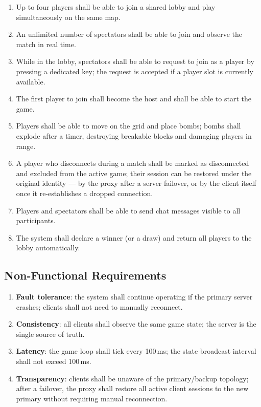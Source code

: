 \documentclass{scrartcl}
\begin{document}
\begin{enumerate}
    \item[\textbf{F1}] Up to four players shall be able to join a shared lobby and play simultaneously on the same map.
    \item[\textbf{F2}] An unlimited number of spectators shall be able to join and observe the match in real time.
    \item[\textbf{F3}] While in the lobby, spectators shall be able to request to join as a player by pressing a dedicated key; the request is accepted if a player slot is currently available.
    \item[\textbf{F4}] The first player to join shall become the host and shall be able to start the game.
    \item[\textbf{F5}] Players shall be able to move on the grid and place bombs; bombs shall explode after a timer, destroying breakable blocks and damaging players in range.
    \item[\textbf{F6}] A player who disconnects during a match shall be marked as disconnected and excluded from the active game; their session can be restored under the original identity --- by the proxy after a server failover, or by the client itself once it re-establishes a dropped connection.
    \item[\textbf{F7}] Players and spectators shall be able to send chat messages visible to all participants.
    \item[\textbf{F8}] The system shall declare a winner (or a draw) and return all players to the lobby automatically.
\end{enumerate}

\subsection{Non-Functional Requirements}

\begin{enumerate}
    \item[\textbf{NF1}] \textbf{Fault tolerance}: the system shall continue operating if the primary server crashes; clients shall not need to manually reconnect.
    \item[\textbf{NF2}] \textbf{Consistency}: all clients shall observe the same game state; the server is the single source of truth.
    \item[\textbf{NF3}] \textbf{Latency}: the game loop shall tick every 100\,ms; the state broadcast interval shall not exceed 100\,ms.
    \item[\textbf{NF4}] \textbf{Transparency}: clients shall be unaware of the primary/backup topology; after a failover, the proxy shall restore all active client sessions to the new primary without requiring manual reconnection.
\end{enumerate}
\end{document}
